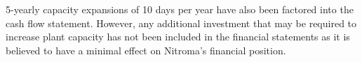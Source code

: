 5-yearly capacity expansions of 10 days per year have also been factored into the cash flow statement. However, any additional investment that may be required to increase plant capacity has not been included in the financial statements as it is believed to have a minimal effect on Nitroma’s financial position.
